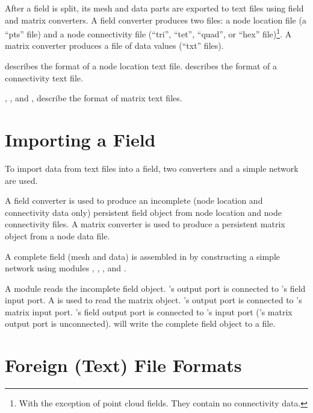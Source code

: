 After a field is split, its mesh and data parts are exported to text
files using field and matrix converters.  A field converter produces
two files: a node location file (a ``pts'' file) and a node
connectivity file (``tri'', ``tet'', ``quad'', or ``hex''
file)\footnote{With the exception of point cloud fields.  They
  contain no connectivity data.}.  A matrix converter produces a file
of data values (``txt'' files).

 describes the format of
a node location text file.  
describes the format of a connectivity text file.

, , and , describe the format of matrix text
files.

\section{Importing a Field}
\label{sec:import_field}

To import data from text files into a \sr{} field, two converters and
a simple \sr{} network are used.

A field converter is used to produce an incomplete (node location and
connectivity data only) persistent field object from node location and
node connectivity files.  A matrix converter is used to produce a
persistent matrix object from a node data file.

A complete field (mesh and data) is assembled in \sr{} by constructing
a simple network using modules ,
, , and
.

A  module reads the incomplete field object.
's output port is connected to
's field input port.  A
 is used to read the matrix object.
's output port is connected to
's matrix input port.
's field output port is connected to
's input port ('s
matrix output port is unconnected).   will write
the complete field object to a file.

\section{Foreign (Text) File Formats}

